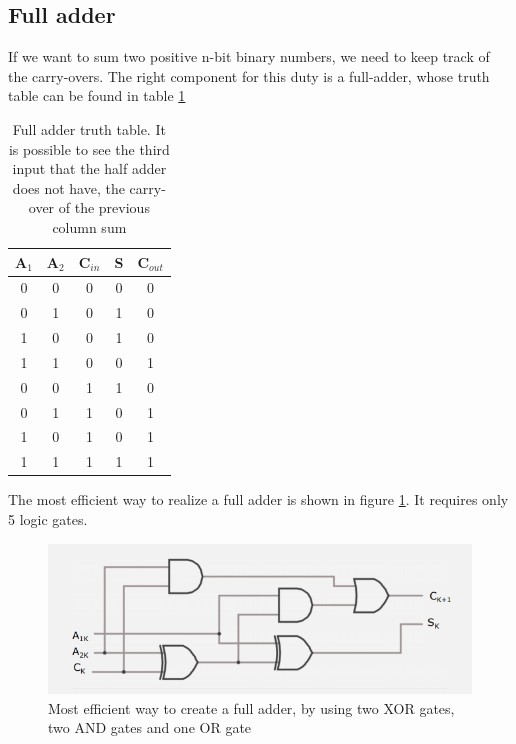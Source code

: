 \documentclass{article}
\begin{document}
\subsection{Full adder}

If we want to sum two positive n-bit binary numbers, we need to keep track of the carry-overs. The right component for this duty is a full-adder, whose truth table can be found in table \ref{FullAdderTT}

\begin{table}[h]
  \centering
  \begin{tabular}{| c | c | c || c | c |}
  \hline
  A$_1$ & A$_2$ & C$_{in}$ & S & C$_{out}$ \\ \hline
  0 & 0 & 0 & 0 & 0 \\ \hline
  0 & 1 & 0 & 1 & 0 \\ \hline
  1 & 0 & 0 & 1 & 0 \\ \hline
  1 & 1 & 0 & 0 & 1 \\ \hline
  0 & 0 & 1 & 1 & 0 \\ \hline
  0 & 1 & 1 & 0 & 1 \\ \hline
  1 & 0 & 1 & 0 & 1 \\ \hline
  1 & 1 & 1 & 1 & 1 \\ \hline
  \end{tabular}
  \caption{Full adder truth table. It is possible to see the third input that the half adder does not have, the carry-over of the previous column sum}
  \label{FullAdderTT}
\end{table}

The most efficient way to realize a full adder is shown in figure \ref{FullAdderCircuit}. It requires only 5 logic gates.

\begin{figure}[h]
  \centering
  \includegraphics[scale=0.6]{IM_full_adder_bis}
  \caption{Most efficient way to create a full adder, by using two XOR gates, two AND gates and one OR gate}
  \label{FullAdderCircuit}
\end{figure}
\end{document}
